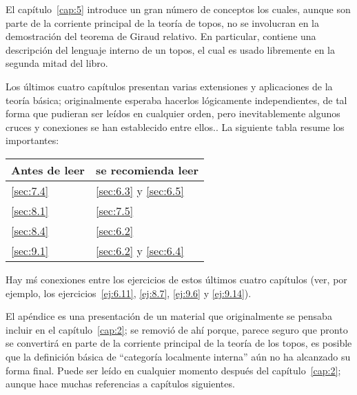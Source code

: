 El capítulo~\ref{cap:5} introduce un gran número de conceptos los cuales, aunque
son parte de la corriente principal de la teoría de topos, no se involucran en
la demostración del teorema de Giraud relativo. En particular, contiene una
descripción del lenguaje interno de un topos, el cual es usado libremente en la
segunda mitad del libro.

Los últimos cuatro capítulos presentan varias extensiones y aplicaciones de la
teoría básica; originalmente esperaba hacerlos lógicamente independientes, de
tal forma que pudieran ser leídos en cualquier orden, pero inevitablemente
algunos cruces y conexiones se han establecido entre ellos.. La siguiente tabla
resume los importantes:
\begin{center}
\begin{tabular}{ll}
  \toprule
  Antes de leer & se recomienda leer \\
  \midrule
  \ref{sec:7.4} & \ref{sec:6.3} y \ref{sec:6.5} \\
  \ref{sec:8.1} & \ref{sec:7.5} \\
  \ref{sec:8.4} & \ref{sec:6.2} \\
  \ref{sec:9.1} & \ref{sec:6.2} y \ref{sec:6.4} \\
  \bottomrule
\end{tabular}
\end{center}
Hay mś conexiones entre los ejercicios de estos últimos cuatro capítulos (ver,
por ejemplo, los ejercicios~\ref{ej:6.11}, \ref{ej:8.7}, \ref{ej:9.6} y
\ref{ej:9.14}).

El apéndice es una presentación de un material que originalmente se pensaba
incluir en el capítulo~\ref{cap:2}; se removió de ahí porque, parece seguro que
pronto se convertirá en parte de la corriente principal de la teoría de los
topos, es posible que la definición básica de \enquote{categoría localmente
interna} aún no ha alcanzado su forma final. Puede ser leído en cualquier
momento después del capítulo~\ref{cap:2}; aunque hace muchas referencias a
capítulos siguientes.

